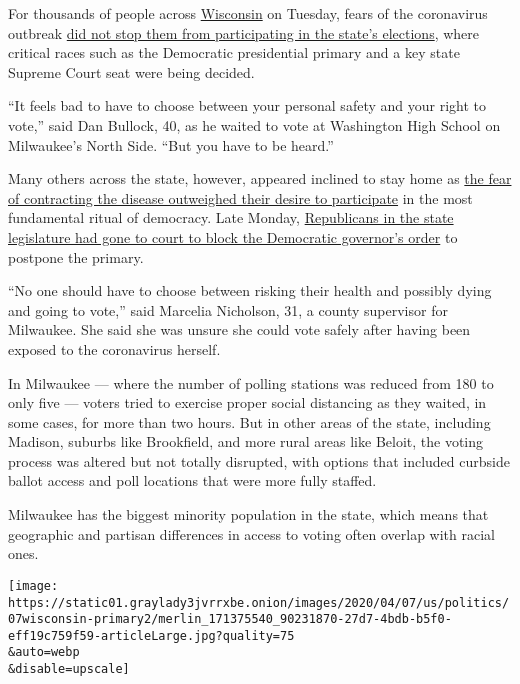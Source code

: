 For thousands of people across
\href{https://www.nytimes3xbfgragh.onion/interactive/2020/05/12/us/elections/live-updates-california-wisconsin-special-election.html}{Wisconsin}
on Tuesday, fears of the coronavirus outbreak
\href{https://www.nytimes3xbfgragh.onion/2020/04/07/us/politics/wisconsin-democratic-voters.html}{did
not stop them from participating in the state's elections}, where
critical races such as the Democratic presidential primary and a key
state Supreme Court seat were being decided.

``It feels bad to have to choose between your personal safety and your
right to vote,'' said Dan Bullock, 40, as he waited to vote at
Washington High School on Milwaukee's North Side. ``But you have to be
heard.''

Many others across the state, however, appeared inclined to stay home as
\href{https://www.nytimes3xbfgragh.onion/2020/04/07/us/politics/wisconsin-primary-election.html}{the
fear of contracting the disease outweighed their desire to participate}
in the most fundamental ritual of democracy. Late Monday,
\href{https://www.nytimes3xbfgragh.onion/2020/04/07/us/politics/wisconsin-pandemic-primary-republicans.html}{Republicans
in the state legislature had gone to court to block the Democratic
governor's order} to postpone the primary.

``No one should have to choose between risking their health and possibly
dying and going to vote,'' said Marcelia Nicholson, 31, a county
supervisor for Milwaukee. She said she was unsure she could vote safely
after having been exposed to the coronavirus herself.

In Milwaukee --- where the number of polling stations was reduced from
180 to only five --- voters tried to exercise proper social distancing
as they waited, in some cases, for more than two hours. But in other
areas of the state, including Madison, suburbs like Brookfield, and more
rural areas like Beloit, the voting process was altered but not totally
disrupted, with options that included curbside ballot access and poll
locations that were more fully staffed.

Milwaukee has the biggest minority population in the state, which means
that geographic and partisan differences in access to voting often
overlap with racial ones.

\texttt{[image: https://static01.graylady3jvrrxbe.onion/images/2020/04/07/us/politics/07wisconsin-primary2/merlin\_171375540\_90231870-27d7-4bdb-b5f0-eff19c759f59-articleLarge.jpg?quality=75\\\&auto=webp\\\&disable=upscale]}

